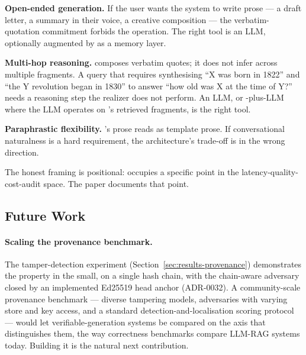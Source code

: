 \textbf{Open-ended generation.} If the user wants the system to
write prose --- a draft letter, a summary in their voice, a
creative composition --- the verbatim-quotation commitment
forbids the operation. The right tool is an LLM, optionally
augmented by \hyphae{} as a memory layer.

\textbf{Multi-hop reasoning.} \hyphae{} composes verbatim quotes;
it does not infer across multiple fragments. A query that
requires synthesising ``X was born in 1822'' and ``the Y revolution
began in 1830'' to answer ``how old was X at the time of Y?''
needs a reasoning step the realizer does not perform. An LLM,
or \hyphae{}-plus-LLM where the LLM operates on \hyphae{}'s
retrieved fragments, is the right tool.

\textbf{Paraphrastic flexibility.} \hyphae{}'s prose reads as
template prose. If conversational naturalness is a hard
requirement, the architecture's trade-off is in the wrong
direction.

The honest framing is positional: \hyphae{} occupies a specific
point in the latency-quality-cost-audit space. The paper
documents that point.

\subsection{Future Work}

\paragraph{Scaling the provenance benchmark.} The tamper-detection
experiment (Section~\ref{sec:results-provenance}) demonstrates the
property in the small, on a single hash chain, with the
chain-aware adversary closed by an implemented Ed25519 head anchor
(ADR-0032). A community-scale provenance benchmark --- diverse
tampering models, adversaries with varying store and key access,
and a standard detection-and-localisation scoring protocol ---
would let verifiable-generation systems be compared on the axis
that distinguishes them, the way correctness benchmarks compare
LLM-RAG systems today. Building it is the natural next
contribution.

